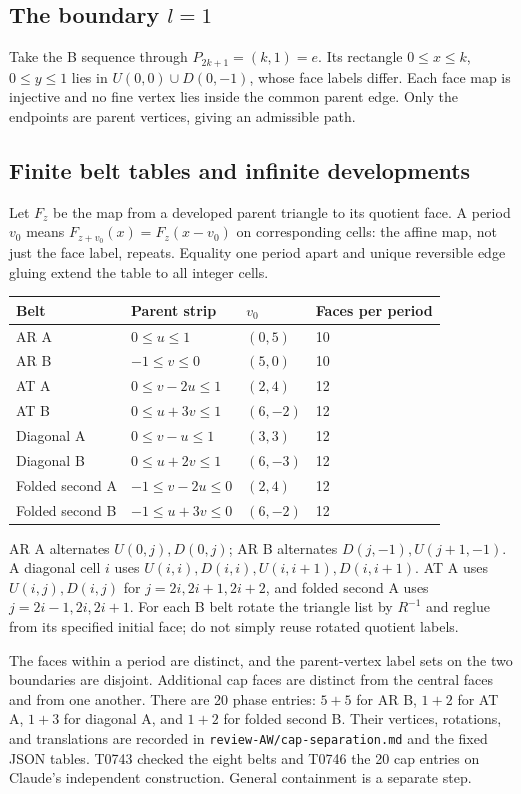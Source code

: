 \documentclass[11pt]{amsart}
\newcommand{\record}[1]{\nolinkurl{#1}}
\begin{document}
\subsection{The boundary \texorpdfstring{$l=1$}{l=1}}
Take the B sequence through $P_{2k+1}=(k,1)=e$. Its rectangle
$0\le x\le k$, $0\le y\le1$ lies in $U(0,0)\cup D(0,-1)$,
whose face labels differ. Each face map is injective and no fine vertex
lies inside the common parent edge. Only the endpoints are parent
vertices, giving an admissible path.

\subsection{Finite belt tables and infinite developments}
Let $F_z$ be the map from a developed parent triangle to its quotient
face. A period $v_0$ means $F_{z+v_0}(x)=F_z(x-v_0)$ on corresponding
cells: the affine map, not just the face label, repeats. Equality one
period apart and unique reversible edge gluing extend the table to all
integer cells.
\begin{center}\small
\begin{tabular}{llll}\toprule
Belt & Parent strip & $v_0$ & Faces per period\\\midrule
AR A & $0\le u\le1$ & $(0,5)$ &10\\
AR B & $-1\le v\le0$ & $(5,0)$ &10\\
AT A & $0\le v-2u\le1$ & $(2,4)$ &12\\
AT B & $0\le u+3v\le1$ & $(6,-2)$ &12\\
Diagonal A & $0\le v-u\le1$ & $(3,3)$ &12\\
Diagonal B & $0\le u+2v\le1$ & $(6,-3)$ &12\\
Folded second A & $-1\le v-2u\le0$ & $(2,4)$ &12\\
Folded second B & $-1\le u+3v\le0$ & $(6,-2)$ &12\\\bottomrule
\end{tabular}\end{center}
AR A alternates $U(0,j),D(0,j)$; AR B alternates
$D(j,-1),U(j+1,-1)$. A diagonal cell $i$ uses
$U(i,i),D(i,i),U(i,i+1),D(i,i+1)$. AT A uses $U(i,j),D(i,j)$ for
$j=2i,2i+1,2i+2$, and folded second A uses $j=2i-1,2i,2i+1$.
For each B belt rotate the triangle list by $R^{-1}$ and reglue from
its specified initial face; do not simply reuse rotated quotient labels.

The faces within a period are distinct, and the parent-vertex label
sets on the two boundaries are disjoint. Additional cap faces are
distinct from the central faces and from one another. There are 20
phase entries: $5+5$ for AR B, $1+2$ for AT A, $1+3$ for diagonal A,
and $1+2$ for folded second B. Their vertices, rotations, and translations
are recorded in \record{review-AW/cap-separation.md} and the fixed JSON
tables. T0743 checked the eight belts and T0746 the 20 cap entries on
Claude's independent construction. General containment is a separate step.
\end{document}

